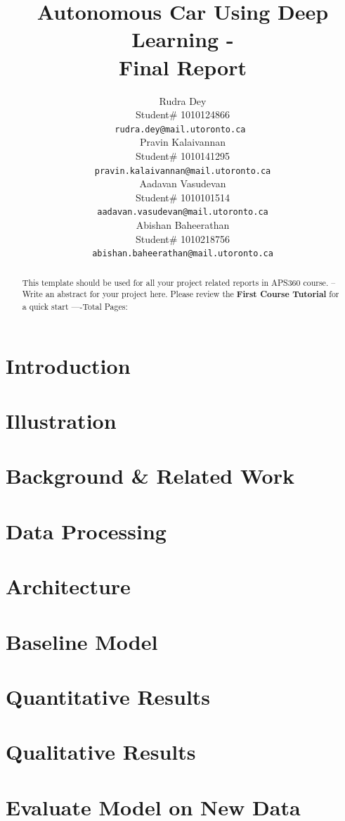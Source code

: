 \documentclass{article} %
\title{Autonomous Car Using Deep Learning - \\Final Report}
\author{Rudra Dey  \\
Student\# 1010124866\\
\texttt{rudra.dey@mail.utoronto.ca } \\
\And
Pravin Kalaivannan  \\
Student\# 1010141295 \\
\texttt{pravin.kalaivannan@mail.utoronto.ca} \\
\AND
Aadavan Vasudevan  \\
Student\# 1010101514 \\
\texttt{aadavan.vasudevan@mail.utoronto.ca} \\
\And
Abishan Baheerathan \\
Student\# 1010218756 \\
\texttt{abishan.baheerathan@mail.utoronto.ca} \\
\AND
}
\begin{document}
\maketitle

\begin{abstract}
This template should be used for all your project related reports in APS360 course. -- Write an abstract for your project here. Please review the \textbf{ First Course Tutorial} for a quick start
----Total Pages: \pageref{last_page}
\end{abstract}


\section{Introduction}

\section{Illustration}

\section{Background \& Related Work}

\section{Data Processing}

\section{Architecture}

\section{Baseline Model}

\section{Quantitative Results}

\section{Qualitative Results}

\section{Evaluate Model on New Data}
\end{document}
